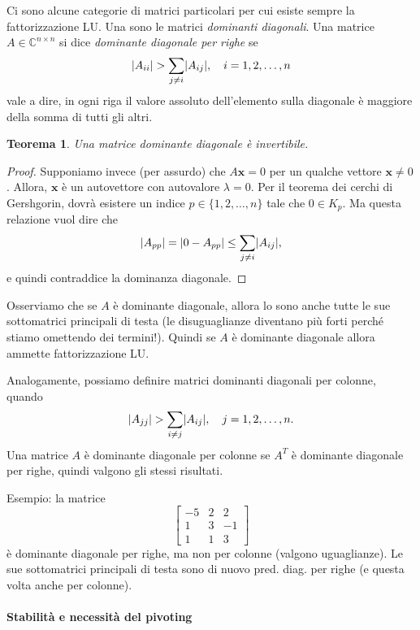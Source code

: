 \documentclass[a4paper]{report}
\DeclarePairedDelimiter{\abs}{\lvert}{\rvert}
\newtheorem{theorem}{Teorema}[chapter]
\theoremstyle{definiton}
\theoremstyle{remark}
\begin{document}
Ci sono alcune categorie di matrici particolari per cui esiste sempre la fattorizzazione LU. Una sono le matrici \emph{dominanti diagonali}. Una matrice $A\in\mathbb{C}^{n\times n}$ si dice \emph{dominante diagonale per righe} se
\[
\abs{A_{ii}} > \sum_{j\neq i} \abs{A_{ij}}, \quad i=1,2,\dots,n
\]
vale a dire, in ogni riga il valore assoluto dell'elemento sulla diagonale è maggiore della somma di tutti gli altri.
\begin{theorem}
Una matrice dominante diagonale è invertibile.
\end{theorem}
\begin{proof}
Supponiamo invece (per assurdo) che $A\mathbf{x}=0$ per un qualche vettore $\mathbf{x}\neq 0$. Allora, $\mathbf{x}$ è un autovettore con autovalore $\lambda=0$. Per il teorema dei cerchi di Gershgorin, dovrà esistere un indice $p\in \{1,2,\dots,n\}$ tale che $0 \in K_p$. Ma questa relazione vuol dire che
\[
\abs{A_{pp}} = \abs{0 - A_{pp}} \leq \sum_{j\neq i} \abs{A_{ij}},
\]
e quindi contraddice la dominanza diagonale.
\end{proof}
Osserviamo che se $A$ è dominante diagonale, allora lo sono anche tutte le sue sottomatrici principali di testa (le disuguaglianze diventano più forti perché stiamo omettendo dei termini!). Quindi se $A$ è dominante diagonale allora ammette fattorizzazione LU.

Analogamente, possiamo definire matrici dominanti diagonali per colonne, quando
\[
\abs{A_{jj}} > \sum_{i\neq j} \abs{A_{ij}}, \quad j=1,2,\dots,n.
\]
Una matrice $A$ è dominante diagonale per colonne se $A^T$ è dominante diagonale per righe, quindi valgono gli stessi risultati.

Esempio: la matrice
\[
\begin{bmatrix}
    -5 & 2 & 2\\
    1 & 3 & -1\\
    1 & 1 & 3
\end{bmatrix}
\]
è dominante diagonale per righe, ma non per colonne (valgono uguaglianze). Le sue sottomatrici principali di testa sono di nuovo pred. diag. per righe (e questa volta anche per colonne).



\paragraph{Stabilità e necessità del pivoting}
\end{document}
